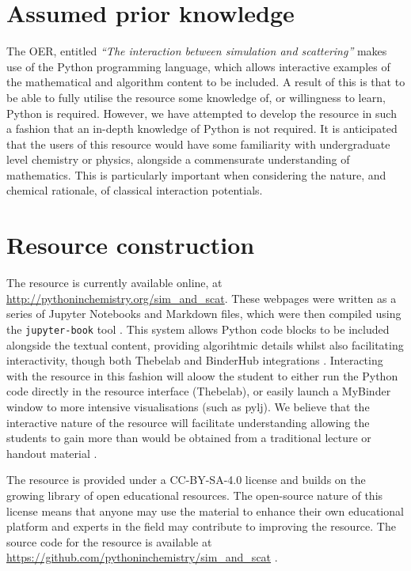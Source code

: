 \documentclass[amsmath,amssymb,twocolumn,superscriptaddress]{revtex4-1}
\begin{document}
\section{Assumed prior knowledge}

The OER, entitled \emph{``The interaction between simulation and scattering''} makes use of the Python programming language, which allows interactive examples of the mathematical and algorithm content to be included.
A result of this is that to be able to fully utilise the resource some knowledge of, or willingness to learn, Python is required.
However, we have attempted to develop the resource in such a fashion that an in-depth knowledge of Python is not required.
It is anticipated that the users of this resource would have some familiarity with undergraduate level chemistry or physics, alongside a commensurate understanding of mathematics.
This is particularly important when considering the nature, and chemical rationale, of classical interaction potentials.

\section{Resource construction}

The resource is currently available online, at \url{http://pythoninchemistry.org/sim_and_scat}.
These webpages were written as a series of Jupyter Notebooks and Markdown files, which were then compiled using the \texttt{jupyter-book} tool \cite{lau_jupyter/jupyter-book_2019}.
This system allows Python code blocks to be included alongside the textual content, providing algorihtmic details whilst also facilitating interactivity, though both Thebelab and BinderHub integrations \cite{ragan-kelley_minrk/thebelab_2019,ragan-kelley_jupyterhub/binderhub_2019,jupyter_binder_2018}.
Interacting with the resource in this fashion will aloow the student to either run the Python code directly in the resource interface (Thebelab), or easily launch a MyBinder window to more intensive visualisations (such as pylj).
We believe that the interactive nature of the resource will facilitate understanding allowing the students to gain more than would be obtained from a traditional lecture or handout material \cite{knuth_literate_1984}.

The resource is provided under a CC-BY-SA-4.0 license \cite{noauthor_creative_2019} and builds on the growing library of open educational resources.
The open-source nature of this license means that anyone may use the material to enhance their own educational platform and experts in the field may contribute to improving the resource.
The source code for the resource is available at \url{https://github.com/pythoninchemistry/sim_and_scat} \cite{mccluskey_pythoninchemistry/sim_and_scat_2019}.
\end{document}
